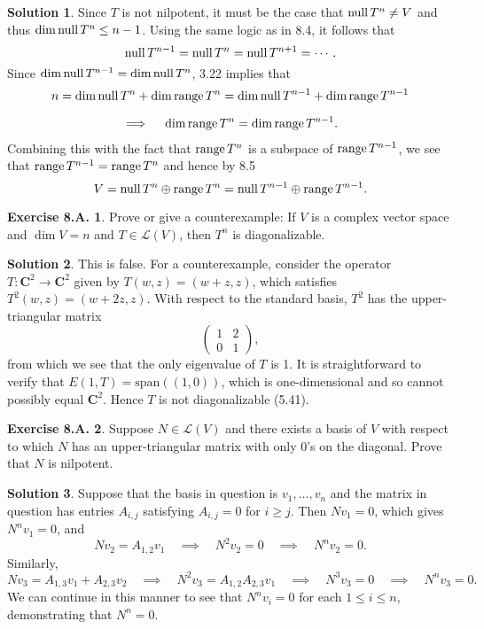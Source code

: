 \documentclass[12pt]{article}
\theoremstyle{definition}
\theoremstyle{exercise}
\newtheorem{exercise}{Exercise 8.A.}
\theoremstyle{solution}
\newtheorem*{solution}{Solution}
\newcommand{\lmap}{\mathcal{L}}
\newcommand{\Span}{\text{span}}
\newcommand{\Null}{\text{null\,}}
\newcommand{\Range}{\text{range\,}}
\newcommand{\quimplies}{\quad \implies \quad}
\newcommand{\C}{\mathbf{C}}
\begin{document}
\begin{solution}
    Since \( T \) is not nilpotent, it must be the case that \( \Null T^n \neq V \) and thus \( \dim \Null T^n \leq n - 1 \). Using the same logic as in 8.4, it follows that
    \[
        \Null T^{n-1} = \Null T^n = \Null T^{n+1} = \cdots \, .  
    \]
    Since \( \dim \Null T^{n-1} = \dim \Null T^n \), 3.22 implies that
    \begin{multline*}
        n = \dim \Null T^n + \dim \Range T^n = \dim \Null T^{n-1} + \dim \Range T^{n-1} \\[2mm]
        \implies \quad \dim \Range T^n = \dim \Range T^{n-1}.
    \end{multline*}
    Combining this with the fact that \( \Range T^n \) is a subspace of \( \Range T^{n-1} \), we see that \( \Range T^{n-1} = \Range T^n \) and hence by 8.5
    \[
        V = \Null T^n \oplus \Range T^n = \Null T^{n-1} \oplus \Range T^{n-1}.
    \]
\end{solution}

\begin{exercise}
\label{ex:11}
    Prove or give a counterexample: If \( V \) is a complex vector space and \( \dim V = n \) and \( T \in \lmap(V) \), then \( T^n \) is diagonalizable.
\end{exercise}

\begin{solution}
    This is false. For a counterexample, consider the operator \( T : \C^2 \to \C^2 \) given by \( T(w, z) = (w + z, z) \), which satisfies \( T^2 (w, z) = (w + 2z, z) \). With respect to the standard basis, \( T^2 \) has the upper-triangular matrix
    \[
        \begin{pmatrix}
            1 & 2 \\
            0 & 1
        \end{pmatrix},
    \]
    from which we see that the only eigenvalue of \( T \) is 1. It is straightforward to verify that \( E(1, T) = \Span((1, 0)) \), which is one-dimensional and so cannot possibly equal \( \C^2 \). Hence \( T \) is not diagonalizable (5.41).
\end{solution}

\begin{exercise}
\label{ex:12}
    Suppose \( N \in \lmap(V) \) and there exists a basis of \( V \) with respect to which \( N \) has an upper-triangular matrix with only 0's on the diagonal. Prove that \( N \) is nilpotent.
\end{exercise}

\begin{solution}
    Suppose that the basis in question is \( v_1, \ldots, v_n \) and the matrix in question has entries \( A_{i,j} \) satisfying \( A_{i,j} = 0 \) for \( i \geq j \). Then \( N v_1 = 0 \), which gives \( N^n v_1 = 0 \), and
    \[
        N v_2 = A_{1,2} v_1 \quimplies N^2 v_2 = 0 \quimplies N^n v_2 = 0.
    \]
    Similarly,
    \[
        N v_3 = A_{1,3} v_1 + A_{2,3} v_2 \quimplies N^2 v_3 = A_{1,2} A_{2,3} v_1 \quimplies N^3 v_3 = 0 \quimplies N^n v_3 = 0.
    \]
    We can continue in this manner to see that \( N^n v_i = 0 \) for each \( 1 \leq i \leq n \), demonstrating that \( N^n = 0 \).
\end{solution}
\end{document}
